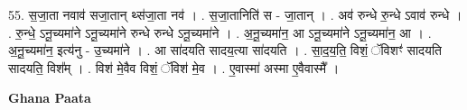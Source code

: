 \documentclass[17pt]{extarticle}
\begin{document}
55. स॒जा॒ता नवाव॑ सजा॒तान् थ्स॑जा॒ता नव॑ । . स॒जा॒तानिति॑ स - जा॒तान् । . अव॑ रुन्धे रु॒न्धे ऽवाव॑ रुन्धे । . रु॒न्धे॒ ऽनू॒च्यमा॑ने ऽनू॒च्यमा॑ने रुन्धे रुन्धे ऽनू॒च्यमा॑ने । . अ॒नू॒च्यमा॑न॒ आ ऽनू॒च्यमा॑ने ऽनू॒च्यमा॑न॒ आ । . अ॒नू॒च्यमा॑न॒ इत्य॑नु - उ॒च्यमा॑ने । . आ सा॑दयति सादय॒त्या सा॑दयति । . सा॒द॒य॒ति॒ विशं॒ ॅविशꣳ॑ सादयति सादयति॒ विश᳚म् । . विश॑ मे॒वैव विशं॒ ॅविश॑ मे॒व । . ए॒वास्मा॑ अस्मा ए॒वैवास्मै᳚ । \newline

\textbf{Ghana Paata } \newline
\end{document}
